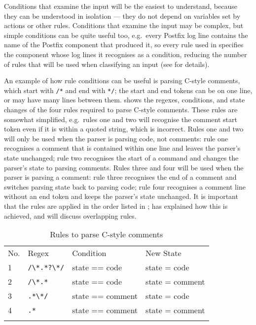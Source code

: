 Conditions that examine the input will be the easiest to understand,
because they can be understood in isolation --- they do not depend on
variables set by actions or other rules.  Conditions that examine the input
may be complex, but simple conditions can be quite useful too, e.g.\ every
Postfix log \empty{}line contains the name of the Postfix component that
produced it, so every rule used in \parsername{} specifies the component
whose log \empty{}lines it recognises as a condition, reducing the number
of rules that will be used when classifying an input (see  for details).

An example of how rule conditions can be useful is parsing C-style
comments, which start with \texttt{/*} and end with \texttt{*/}; the start
and end tokens can be on one line, or may have many lines between them.
 shows the regexes, conditions,
and state changes of the four rules required to parse C-style comments.
These rules are somewhat simplified, e.g.\ rules one and two will recognise
the comment start token even if it is within a quoted string, which is
incorrect.  Rules one and two will only be used when the parser is parsing
code, not comments: rule one recognises a comment that is contained within
one line and leaves the parser's state unchanged; rule two recognises the
start of a command and changes the parser's state to parsing comments.
Rules three and four will be used when the parser is parsing a comment:
rule three recognises the end of a comment and switches parsing state back
to parsing code; rule four recognises a comment line without an end token
and keeps the parser's state unchanged.  It is important that the rules are
applied in the order listed in ;
 has explained how this is achieved, and
 will discuss overlapping
rules.

\begin{table}[ht]
    \caption{Rules to parse C-style comments}
    \empty{}\label{Rules to parse C-style comments}
    \begin{tabular}{llll}
        \tabletopline{}%
        No.   & Regex             & Condition         & New State         \\
        \tablemiddleline{}%
        1     & \verb!/\*.*?\*/!  & state == code     & state = code      \\
        2     & \verb!/\*.*!      & state == code     & state = comment   \\
        3     & \verb!.*\*/!      & state == comment  & state = code      \\
        4     & \verb!.*!         & state == comment  & state = comment   \\
        \tablebottomline{}%
    \end{tabular}
\end{table}

